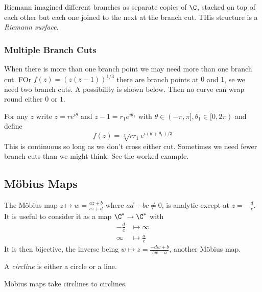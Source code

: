 \documentclass[a4paper]{article}
\begin{document}
Riemann imagined different branches as separate copies of \(\C\), stacked on top of each other but each one joined to the next at the branch cut. THis structure is a \emph{Riemann surface}.

\subsubsection{Multiple Branch Cuts}

When there is more than one branch point we may need more than one branch cut. FOr \(f(z) = (z(z - 1))^{1/3}\) there are branch points at \(0\) and \(1\), se we need two branch cuts. A possibility is shown below. Then no curve can wrap round either \(0\) or \(1\).

For any \(z\) write \(z = re^{i\theta}\) and \(z - 1 = r_1e^{i\theta_1}\) with \(\theta \in (-\pi, \pi], \theta_1 \in [0, 2\pi)\) and define
\[
  f(z) = \sqrt[3]{rr_1} e^{i(\theta + \theta_1)/3}
\]
This is continuous so long as we don't cross either cut. Sometimes we need fewer branch cuts than we might think. See the worked example.

\subsection{Möbius Maps}

The Möbius map \(z \mapsto w = \frac{az + b}{cz + d}\) where \(ad - bc \neq 0\), is analytic except at \(z = -\frac{d}{c}\). It is useful to consider it as a map \(\C^* \to \C^*\) with
\begin{align*}
  -\frac{d}{c} &\mapsto \infty \\
  \infty &\mapsto \frac{a}{c}
\end{align*}
It is then bijective, the inverse being \(w \mapsto z = \frac{-dw + b}{cw - a}\), another Möbius map.

\begin{definition}[Circline]
  A \emph{circline} is either a circle or a line.
\end{definition}

Möbius maps take circlines to circlines.
\end{document}
